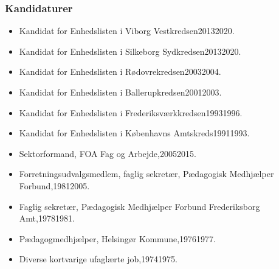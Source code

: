 \documentclass[11pt, a4paper]{awesome-cv}
\begin{document}
\begin{cvletter}
\subsubsection*{Kandidaturer}
\begin{itemize}
\item Kandidat for Enhedslisten i Viborg Vestkredsen20132020.
\item Kandidat for Enhedslisten i Silkeborg Sydkredsen20132020.
\item Kandidat for Enhedslisten i Rødovrekredsen20032004.
\item Kandidat for Enhedslisten i Ballerupkredsen20012003.
\item Kandidat for Enhedslisten i Frederiksværkkredsen19931996.
\item Kandidat for Enhedslisten i Københavns Amtskreds19911993.
\end{itemize}
\begin{itemize}
\item Sektorformand, FOA  Fag og Arbejde,20052015.
\item Forretningsudvalgsmedlem, faglig sekretær, Pædagogisk Medhjælper Forbund,19812005.
\item Faglig sekretær, Pædagogisk Medhjælper Forbund Frederiksborg Amt,19781981.
\item Pædagogmedhjælper, Helsingør Kommune,19761977.
\item Diverse kortvarige ufaglærte job,19741975.
\end{itemize}
\end{cvletter}
\end{document}
